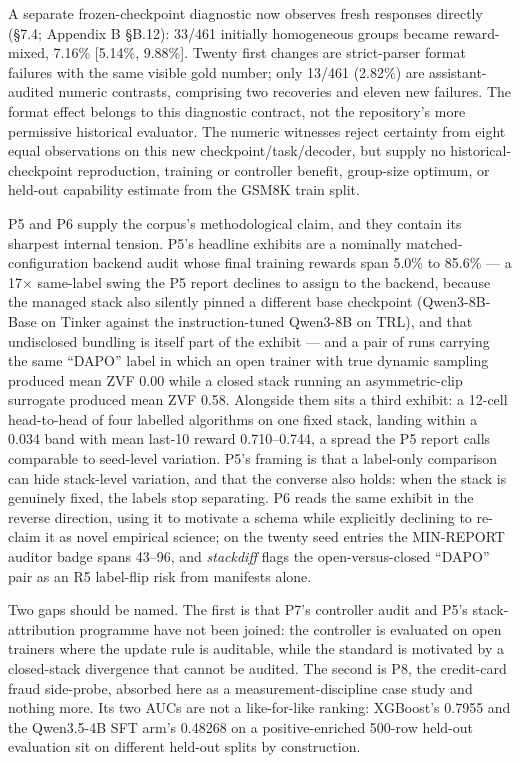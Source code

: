 \documentclass[12pt,a4paper]{report}
\begin{document}
A separate frozen-checkpoint diagnostic now observes fresh responses
directly (§7.4; Appendix B §B.12): 33/461 initially homogeneous groups
became reward-mixed, 7.16\% {[}5.14\%, 9.88\%{]}. Twenty first changes
are strict-parser format failures with the same visible gold number;
only 13/461 (2.82\%) are assistant-audited numeric contrasts, comprising
two recoveries and eleven new failures. The format effect belongs to
this diagnostic contract, not the repository's more permissive
historical evaluator. The numeric witnesses reject certainty from eight
equal observations on this new checkpoint/task/decoder, but supply no
historical-checkpoint reproduction, training or controller benefit,
group-size optimum, or held-out capability estimate from the GSM8K train
split.

P5 and P6 supply the corpus's methodological claim, and they contain its
sharpest internal tension. P5's headline exhibits are a nominally
matched-configuration backend audit whose final training rewards span
5.0\% to 85.6\% --- a 17× same-label swing the P5 report declines to
assign to the backend, because the managed stack also silently pinned a
different base checkpoint (Qwen3-8B-Base on Tinker against the
instruction-tuned Qwen3-8B on TRL), and that undisclosed bundling is
itself part of the exhibit --- and a pair of runs carrying the same
``DAPO'' label in which an open trainer with true dynamic sampling
produced mean ZVF 0.00 while a closed stack running an asymmetric-clip
surrogate produced mean ZVF 0.58. Alongside them sits a third exhibit: a
12-cell head-to-head of four labelled algorithms on one fixed stack,
landing within a 0.034 band with mean last-10 reward 0.710--0.744, a
spread the P5 report calls comparable to seed-level variation. P5's
framing is that a label-only comparison can hide stack-level variation,
and that the converse also holds: when the stack is genuinely fixed, the
labels stop separating. P6 reads the same exhibit in the reverse
direction, using it to motivate a schema while explicitly declining to
re-claim it as novel empirical science; on the twenty seed entries the
MIN-REPORT auditor badge spans 43--96, and \emph{stackdiff} flags the
open-versus-closed ``DAPO'' pair as an R5 label-flip risk from manifests
alone.

Two gaps should be named. The first is that P7's controller audit and
P5's stack-attribution programme have not been joined: the controller is
evaluated on open trainers where the update rule is auditable, while the
standard is motivated by a closed-stack divergence that cannot be
audited. The second is P8, the credit-card fraud side-probe, absorbed
here as a measurement-discipline case study and nothing more. Its two
AUCs are not a like-for-like ranking: XGBoost's 0.7955 and the
Qwen3.5-4B SFT arm's 0.48268 on a positive-enriched 500-row held-out
evaluation sit on different held-out splits by construction.
\end{document}
